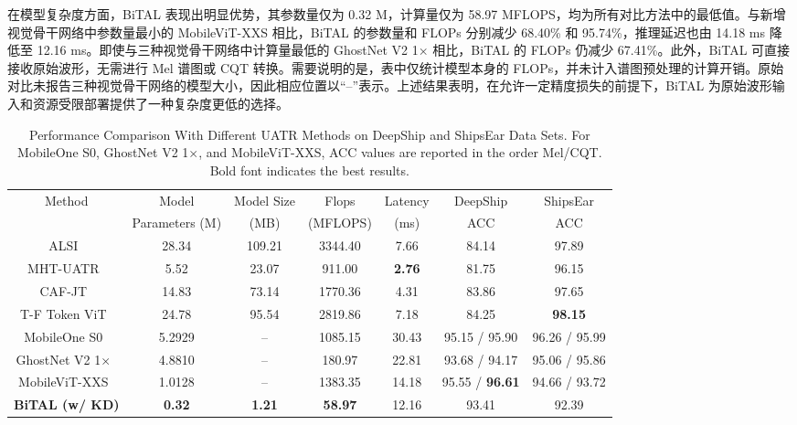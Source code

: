 \documentclass[a4paper, 12pt]{article}
\begin{document}
在模型复杂度方面，BiTAL 表现出明显优势，其参数量仅为 0.32 M，计算量仅为 58.97 MFLOPS，均为所有对比方法中的最低值。与新增视觉骨干网络中参数量最小的 MobileViT-XXS 相比，BiTAL 的参数量和 FLOPs 分别减少 68.40\% 和 95.74\%，推理延迟也由 14.18 ms 降低至 12.16 ms。即使与三种视觉骨干网络中计算量最低的 GhostNet V2 1$\times$ 相比，BiTAL 的 FLOPs 仍减少 67.41\%。此外，BiTAL 可直接接收原始波形，无需进行 Mel 谱图或 CQT 转换。需要说明的是，表中仅统计模型本身的 FLOPs，并未计入谱图预处理的计算开销。原始对比未报告三种视觉骨干网络的模型大小，因此相应位置以“--”表示。上述结果表明，在允许一定精度损失的前提下，BiTAL 为原始波形输入和资源受限部署提供了一种复杂度更低的选择。

\begin{table}[!htbp]
\centering
\caption{Performance Comparison With Different UATR Methods on DeepShip and ShipsEar Data Sets. For MobileOne S0, GhostNet V2 1$\times$, and MobileViT-XXS, ACC values are reported in the order Mel/CQT. Bold font indicates the best results.}
\label{tab:comparison with Different UATR Methods}
\small
\setlength{\tabcolsep}{4pt}

\begin{tabular}{c|c|c|c|c|c|c}
\toprule
\multirow{2}{*}{Method} & 
\multicolumn{1}{c|}{Model} & 
\multicolumn{1}{c|}{Model Size} & 
\multicolumn{1}{c|}{Flops} & 
\multicolumn{1}{c|}{Latency} & 
\multicolumn{1}{c|}{DeepShip} & 
\multicolumn{1}{c}{ShipsEar} \\
 & Parameters (M) & (MB) & (MFLOPS) & (ms) & ACC & ACC \\
\midrule

ALSI~\cite{ALSIUATR} & 28.34 & 109.21 & 3344.40 & 7.66 & 84.14 & 97.89  \\
MHT-UATR~\cite{MHTUATR} & 5.52 & 23.07 & 911.00 & \textbf{2.76} & 81.75 & 96.15 \\
CAF-JT~\cite{CAFJTUATR} & 14.83 & 73.14 & 1770.36 & 4.31 & 83.86 & 97.65 \\
T-F Token ViT~\cite{TFTokenViT} & 24.78 & 95.54 & 2819.86 & 7.18 & 84.25 & \textbf{98.15} \\
MobileOne S0~\cite{Vasu2023MobileOne} & 5.2929 & -- & 1085.15 & 30.43 & 95.15 / 95.90 & 96.26 / 95.99 \\
GhostNet V2 1$\times$~\cite{Tang2022GhostNetV2} & 4.8810 & -- & 180.97 & 22.81 & 93.68 / 94.17 & 95.06 / 95.86 \\
MobileViT-XXS~\cite{Mehta2022MobileViT} & 1.0128 & -- & 1383.35 & 14.18 & 95.55 / \textbf{96.61} & 94.66 / 93.72 \\
\textbf{BiTAL (w/ KD)} & \textbf{0.32} & \textbf{1.21} & \textbf{58.97} & 12.16 & 93.41 & 92.39 \\

\bottomrule
\end{tabular}
\end{table}
\end{document}
